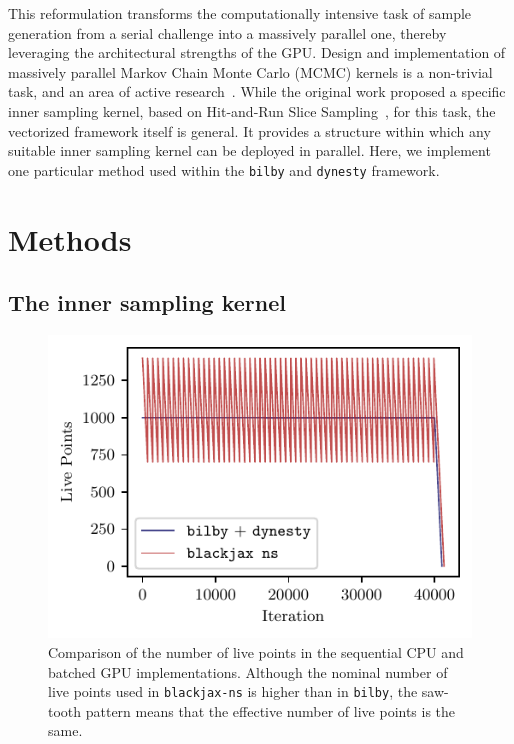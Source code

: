 \documentclass[fleqn,usenatbib]{mnras}
\begin{document}
This reformulation transforms the computationally intensive task of
sample generation from a serial challenge into a massively parallel one,
thereby leveraging the architectural strengths of the GPU. Design and implementation of massively parallel Markov Chain Monte Carlo (MCMC) kernels is a non-trivial task, and an area of active research~\citep{pmlr-v151-hoffman22a,pmlr-v130-hoffman21a}. While the
original work proposed a specific inner sampling kernel, based on
Hit-and-Run Slice Sampling~\citep{Neal2003_slice}, for this task,
the vectorized framework itself is general. It provides a structure
within which any suitable inner sampling kernel can be deployed in
parallel. Here, we implement one particular method used within the \texttt{bilby}
and \texttt{dynesty} framework.




\section{Methods}
\label{sec:methods}

\subsection{The inner sampling kernel}
\label{sec:methods_kernel}

\begin{figure}
    \centering
    \includegraphics{figures/nlive_comparison.pdf}
    \caption{Comparison of the number of live points in the sequential CPU and batched GPU implementations.
    Although the nominal number of live points used in \texttt{blackjax-ns} is higher than in \texttt{bilby},
    the saw-tooth pattern means that the effective number of live points is the same.}
    \label{fig:nlive_comparison}
\end{figure}
\end{document}
